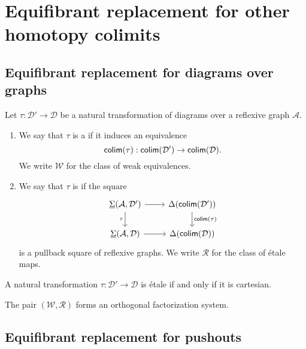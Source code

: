 \section{Equifibrant replacement for other homotopy colimits}

\subsection{Equifibrant replacement for diagrams over graphs}

\begin{defn}
Let $\tau:\mathcal{D}'\to\mathcal{D}$ be a natural transformation of diagrams over a reflexive graph $\mathcal{A}$. 
\begin{enumerate}
\item We say that $\tau$ is a  if it induces an equivalence
\begin{equation*}
\mathsf{colim}(\tau):\mathsf{colim}(\mathcal{D}')\to\mathsf{colim}(\mathcal{D}).
\end{equation*}
We write $\mathcal{W}$ for the class of weak equivalences.
\item We say that $\tau$ is  if the square
\begin{equation*}
\begin{tikzcd}
\msm{\mathcal{A}}{\mathcal{D}'} \arrow[d,swap,"\tau"] \arrow[r] & \Delta(\tfcolim(\mathcal{D}')) \arrow[d,"\tfcolim(\tau)"] \\
\msm{\mathcal{A}}{\mathcal{D}} \arrow[r] & \Delta(\tfcolim(\mathcal{D}))
\end{tikzcd}
\end{equation*}
is a pullback square of reflexive graphs. We write $\mathcal{R}$ for the class of \'etale maps.
\end{enumerate}
\end{defn}

\begin{thm}
A natural transformation $\tau:\mathcal{D}'\to\mathcal{D}$ is \'etale if and only if it is cartesian.
\end{thm}

\begin{thm}
The pair $(\mathcal{W},\mathcal{R})$ forms an orthogonal factorization system. 
\end{thm}

\subsection{Equifibrant replacement for pushouts}

